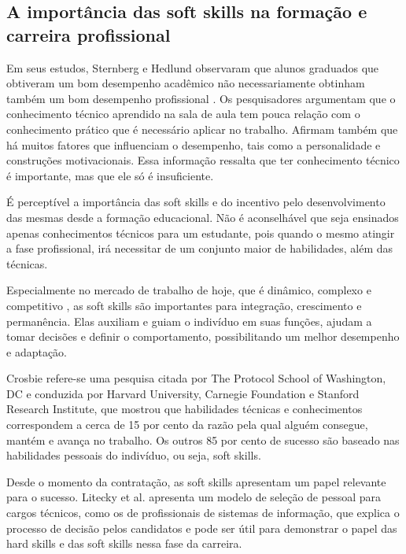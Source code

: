 	
\subsection{A importância das soft skills na formação e carreira profissional}
\label{subsec:ss-importance}

Em seus estudos, Sternberg e Hedlund observaram que alunos graduados que obtiveram um bom desempenho acadêmico não necessariamente obtinham também um bom desempenho profissional \cite{sternberg:02}. Os pesquisadores argumentam que o conhecimento técnico aprendido na sala de aula tem pouca relação com o conhecimento prático que é necessário aplicar no trabalho. Afirmam também que há muitos fatores que influenciam o desempenho, tais como a personalidade e construções motivacionais. Essa informação ressalta que ter conhecimento técnico é importante, mas que ele só é insuficiente. 

É perceptível a importância das soft skills e do incentivo pelo desenvolvimento das mesmas desde a formação educacional. Não é aconselhável que seja ensinados apenas conhecimentos técnicos para um estudante, pois quando o mesmo atingir a fase profissional, irá necessitar de um conjunto maior de habilidades, além das técnicas.

Especialmente no mercado de trabalho de hoje, que é dinâmico, complexo e competitivo \cite{joseph:10}, as soft skills são importantes para integração, crescimento e permanência. Elas auxiliam e guiam o indivíduo em suas funções, ajudam a tomar decisões e definir o comportamento, possibilitando um melhor desempenho e adaptação. 

Crosbie \cite{crosbie:05} refere-se uma pesquisa citada por The Protocol School of Washington, DC e conduzida por Harvard University, Carnegie Foundation e Stanford Research Institute, que mostrou que habilidades técnicas e conhecimentos correspondem a cerca de 15 por cento da razão pela qual alguém consegue, mantém e avança no trabalho. Os outros 85 por cento de sucesso são baseado nas habilidades pessoais do indivíduo, ou seja, soft skills.

Desde o momento da contratação, as soft skills apresentam um papel relevante para o sucesso. Litecky et al.\cite{litecky:04} apresenta um modelo de seleção de pessoal para cargos técnicos, como os de profissionais de sistemas de informação, que explica o processo de decisão pelos candidatos e pode ser útil para demonstrar o papel das hard skills e das soft skills nessa fase da carreira.

